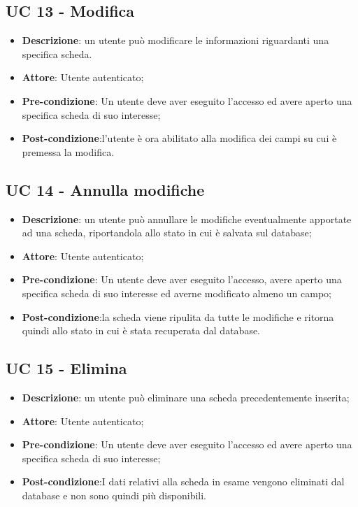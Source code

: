 \subsection{UC 13 - Modifica}

\begin{itemize}
	\item \textbf{Descrizione}: un utente può modificare le informazioni riguardanti una specifica scheda.
	\item \textbf{Attore}: Utente autenticato;
	\item \textbf{Pre-condizione}: Un utente deve aver eseguito l'accesso ed avere aperto una specifica scheda di suo interesse;
	\item \textbf{Post-condizione}:l'utente è ora abilitato alla modifica dei campi su cui è premessa la modifica.
\end{itemize}

\subsection{UC 14 - Annulla modifiche}

\begin{itemize}
	\item \textbf{Descrizione}: un utente può annullare le modifiche eventualmente apportate ad una scheda, riportandola allo stato in cui è salvata sul database;
	\item \textbf{Attore}: Utente autenticato;
	\item \textbf{Pre-condizione}: Un utente deve aver eseguito l'accesso, avere aperto una specifica scheda di suo interesse ed averne modificato almeno un campo;
	\item \textbf{Post-condizione}:la scheda viene ripulita da tutte le modifiche e ritorna quindi allo stato in cui è stata recuperata dal database.
\end{itemize}

\subsection{UC 15 - Elimina}

\begin{itemize}
	\item \textbf{Descrizione}: un utente può eliminare una scheda precedentemente inserita;
	\item \textbf{Attore}: Utente autenticato;
	\item \textbf{Pre-condizione}: Un utente deve aver eseguito l'accesso ed avere aperto una specifica scheda di suo interesse;
	\item \textbf{Post-condizione}:I dati relativi alla scheda in esame vengono eliminati dal database e non sono quindi più disponibili.
\end{itemize}

